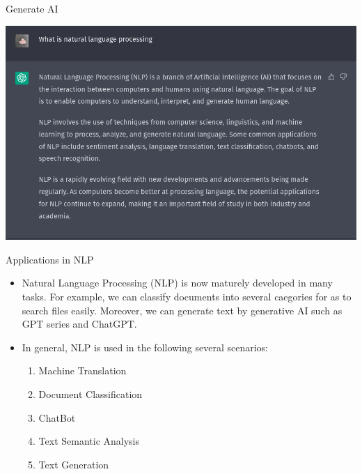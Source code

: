 \begin{frame}[fragile]{Generate AI}

  \includegraphics[scale=0.35]{../images/img_1.png}

\end{frame}

\begin{frame}[fragile]{Applications in NLP}

  \begin{itemize}
    \item Natural Language Processing (NLP) is now maturely developed in many tasks. For example, we can classify documents into several caegories for as to search files easily. Moreover, we can generate text by generative AI such as GPT series and ChatGPT.
    \item In general, NLP is used in the following several scenarios:
          \begin{enumerate}
            \item Machine Translation
            \item Document Classification
            \item ChatBot
            \item Text Semantic Analysis
            \item Text Generation
          \end{enumerate}
  \end{itemize}

\end{frame}